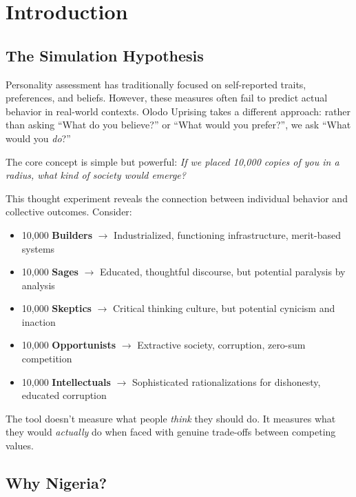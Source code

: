 \documentclass[11pt,a4paper]{article}
\begin{document}
\tableofcontents
\newpage

\section{Introduction}

\subsection{The Simulation Hypothesis}

Personality assessment has traditionally focused on self-reported traits, preferences, and beliefs. However, these measures often fail to predict actual behavior in real-world contexts. Olodo Uprising takes a different approach: rather than asking ``What do you believe?'' or ``What would you prefer?'', we ask ``What would you \textit{do}?''

The core concept is simple but powerful: \textit{If we placed 10,000 copies of you in a radius, what kind of society would emerge?}

This thought experiment reveals the connection between individual behavior and collective outcomes. Consider:
\begin{itemize}[leftmargin=*]
    \item 10,000 \textbf{Builders} $\rightarrow$ Industrialized, functioning infrastructure, merit-based systems
    \item 10,000 \textbf{Sages} $\rightarrow$ Educated, thoughtful discourse, but potential paralysis by analysis
    \item 10,000 \textbf{Skeptics} $\rightarrow$ Critical thinking culture, but potential cynicism and inaction
    \item 10,000 \textbf{Opportunists} $\rightarrow$ Extractive society, corruption, zero-sum competition
    \item 10,000 \textbf{Intellectuals} $\rightarrow$ Sophisticated rationalizations for dishonesty, educated corruption
\end{itemize}

The tool doesn't measure what people \textit{think} they should do. It measures what they would \textit{actually} do when faced with genuine trade-offs between competing values.

\subsection{Why Nigeria?}
\end{document}

